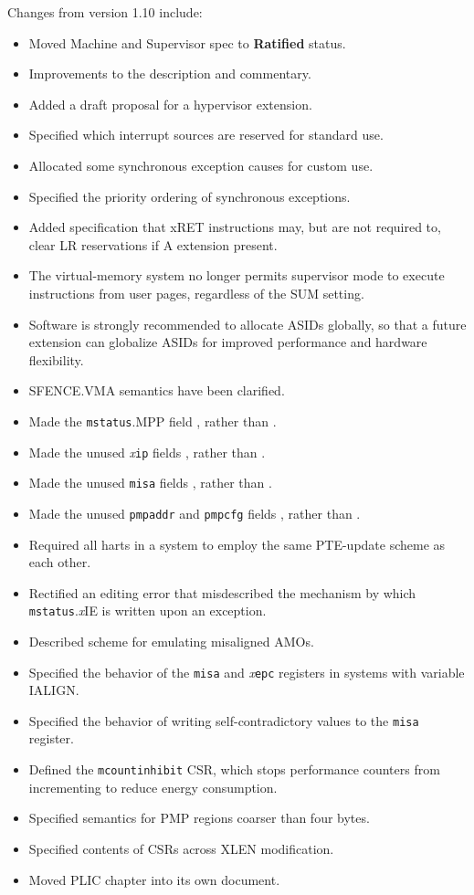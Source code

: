 Changes from version 1.10 include:
\vspace{-0.2in}
\begin{itemize}
  \parskip 0pt
  \itemsep 1pt
  \item Moved Machine and Supervisor spec to {\bf Ratified} status.
\item Improvements to the description and commentary.
\item Added a draft proposal for a hypervisor extension.
\item Specified which interrupt sources are reserved for standard use.
\item Allocated some synchronous exception causes for custom use.
\item Specified the priority ordering of synchronous exceptions.
\item Added specification that xRET instructions may, but are not
  required to, clear LR reservations if A extension present.
\item The virtual-memory system no longer permits supervisor mode to execute
  instructions from user pages, regardless of the SUM setting.
\item Software is strongly recommended to allocate ASIDs globally, so that
  a future extension can globalize ASIDs for improved performance and hardware
  flexibility.
\item SFENCE.VMA semantics have been clarified.
\item Made the {\tt mstatus}.MPP field \warl, rather than \wlrl.
\item Made the unused {\em x}{\tt ip} fields \wpri, rather than \wiri.
\item Made the unused {\tt misa} fields \wlrl, rather than \wiri.
\item Made the unused {\tt pmpaddr} and {\tt pmpcfg} fields \warl, rather than \wiri.
\item Required all harts in a system to employ the same PTE-update scheme as each other.
\item Rectified an editing error that misdescribed the mechanism by which
  {\tt mstatus}.{\em x}IE is written upon an exception.
\item Described scheme for emulating misaligned AMOs.
\item Specified the behavior of the {\tt misa} and {\em x}{\tt epc} registers in
  systems with variable IALIGN.
\item Specified the behavior of writing self-contradictory values to the
  {\tt misa} register.
\item Defined the {\tt mcountinhibit} CSR, which stops performance
  counters from incrementing to reduce energy consumption.
\item Specified semantics for PMP regions coarser than four bytes.
\item Specified contents of CSRs across XLEN modification.
\item Moved PLIC chapter into its own document.
\end{itemize}

